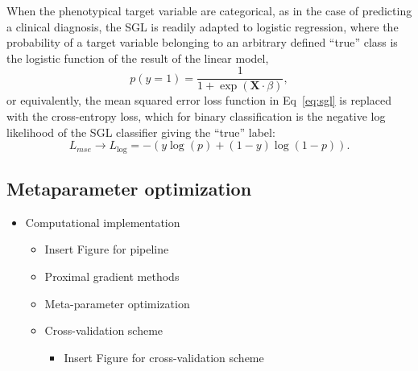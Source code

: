 When the phenotypical target variable are categorical, as in the case of predicting a clinical diagnosis, the SGL is readily adapted to logistic regression, where the probability of a target variable belonging to an arbitrary defined ``true'' class is the logistic function of the result of the linear model,
\begin{equation}
    p(y = 1) = \frac{1}{1 + \exp(\mathbf{X}\cdot \beta)},
    \label{eq:logit}
\end{equation}
or equivalently, the mean squared error loss function in Eq~\eqref{eq:sgl} is replaced with the cross-entropy loss, which for binary classification is the negative log likelihood of the SGL classifier giving the ``true'' label:
\begin{equation}
    L_{mse} \rightarrow L_{\log} = -\left(y \log(p) + (1 - y) \log(1 - p)\right).
    \label{eq:logloss}
\end{equation}

\subsection*{Metaparameter optimization}

\begin{itemize}
  \item Computational implementation
    \begin{itemize}
      \item Insert Figure for pipeline
      \item Proximal gradient methods
      \item Meta-parameter optimization
      \item Cross-validation scheme
        \begin{itemize}
          \item Insert Figure for cross-validation scheme
        \end{itemize}
    \end{itemize}
\end{itemize}
